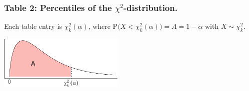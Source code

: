 \documentclass[]{article}
\begin{document}
\hypertarget{table-2-percentiles-of-the-chi2-distribution.}{%
\subsubsection{\texorpdfstring{Table 2: Percentiles of the
\(\chi^2\)-distribution.}{Table 2: Percentiles of the \textbackslash{}chi\^{}2-distribution.}}\label{table-2-percentiles-of-the-chi2-distribution.}}

Each table entry is \(\chi^2_k(\alpha)\), where
\(\text{P}\big(X < \chi^2_k(\alpha)\big)=A=1-\alpha\) with
\(X\sim\chi^2_k\). \vspace{0.5em}

\begin{center}\includegraphics[width=6cm]{stat-tables_files/figure-latex/unnamed-chunk-3-1} \end{center}

\vspace{-0.5em}
\end{document}
